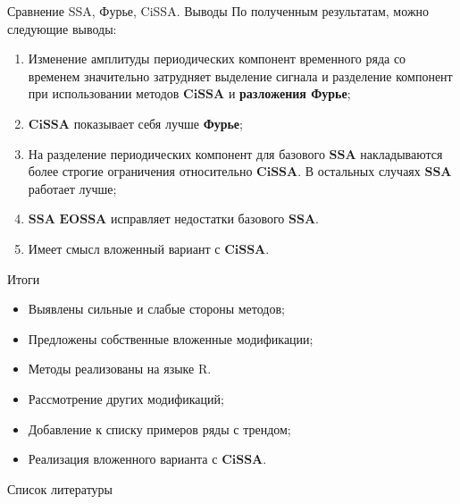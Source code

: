 \documentclass[notheorems, handout]{beamer}
\newcommand{\SSA}{\textbf{SSA}}
\newcommand{\EOSSA}{\textbf{EOSSA}}
\newcommand{\CISSA}{\textbf{CiSSA}}
\begin{document}
	
	\begin{frame}{Сравнение SSA, Фурье, CiSSA. Выводы}
		По полученным результатам, можно следующие выводы: 
		\begin{enumerate}
			\item Изменение амплитуды периодических компонент временного ряда со временем значительно затрудняет выделение сигнала и разделение компонент при использовании методов 
			$\CISSA$ и \textbf{разложения Фурье};
			\item $\CISSA$ показывает себя лучше \textbf{Фурье};
			\item На разделение периодических компонент для базового $\SSA$ накладываются более строгие ограничения относительно $\CISSA$. В остальных случаях $\SSA$ работает лучше;
			\item $\SSA$ $\EOSSA$ исправляет недостатки базового $\SSA$.
			\item Имеет смысл вложенный вариант с $\CISSA$.
		\end{enumerate}

		
	\end{frame}
	

	\begin{frame}{Итоги}
		\textbf{}
		\begin{itemize}
			\item Выявлены сильные и слабые стороны методов;
			\item Предложены собственные вложенные модификации;
			\item Методы реализованы на языке R.
		\end{itemize}

		\textbf{}
		\begin{itemize}
			\item Рассмотрение других модификаций;
			\item Добавление к списку примеров ряды с трендом;
			\item Реализация вложенного варианта с $\CISSA$.
		\end{itemize}
	\end{frame}
	
	
	\begin{frame}[allowframebreaks]{Список литературы}
		\printbibliography
	\end{frame}

	
\end{document}
